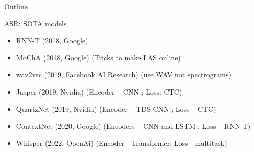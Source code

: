 
\usepackage{tikz}
\usetikzlibrary{arrows,shapes,positioning,shadows,trees}

\begin{frame}
\titlepage
\end{frame}
\begin{frame}{Outline}
	\tableofcontents
\end{frame}
\begin{frame}{ASR: SOTA models}
    \begin{itemize}
        \item RNN-T (2018, Google)
        \item MoChA (2018, Google) (Tricks to make LAS online)
        \item wav2vec (2019, Facebook AI Research) (use WAV not spectrograms)
        \item Jasper (2019, Nvidia) (Encoder – CNN ; Loss: CTC)
        \item QuartzNet (2019, Nvidia) (Encoder – TDS CNN ; Loss – CTC)
        \item ContextNet (2020, Google) (Encoders – CNN and LSTM ; Loss – RNN-T)
        \item Whisper (2022, OpenAi) (Encoder - Transformer; Loss - multitask)
    \end{itemize}
\end{frame}
